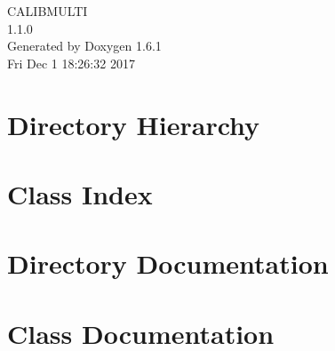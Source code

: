 \documentclass[a4paper]{book}
\begin{document}
\begin{titlepage}
\vspace*{7cm}
\begin{center}
{\Large CALIBMULTI \\[1ex]\large 1.1.0 }\\
\vspace*{1cm}
{\large Generated by Doxygen 1.6.1}\\
\vspace*{0.5cm}
{\small Fri Dec 1 18:26:32 2017}\\
\end{center}
\end{titlepage}
\clearemptydoublepage
{}
\tableofcontents
\clearemptydoublepage
{}
\chapter{Directory Hierarchy}

\chapter{Class Index}

\chapter{Directory Documentation}




\chapter{Class Documentation}


\printindex
\end{document}
